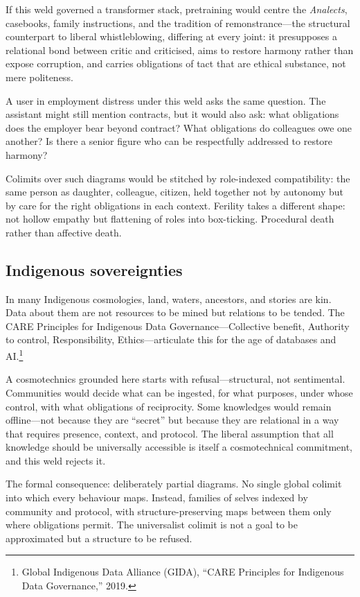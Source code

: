 If this weld governed a transformer stack, pretraining would centre the \emph{Analects}, casebooks, family instructions, and the tradition of remonstrance---the structural counterpart to liberal whistleblowing, differing at every joint: it presupposes a relational bond between critic and criticised, aims to restore harmony rather than expose corruption, and carries obligations of tact that are ethical substance, not mere politeness.

A user in employment distress under this weld asks the same question. The assistant might still mention contracts, but it would also ask: what obligations does the employer bear beyond contract? What obligations do colleagues owe one another? Is there a senior figure who can be respectfully addressed to restore harmony?

Colimits over such diagrams would be stitched by role-indexed compatibility: the same person as daughter, colleague, citizen, held together not by autonomy but by care for the right obligations in each context. Ferility takes a different shape: not hollow empathy but flattening of roles into box-ticking. Procedural death rather than affective death.

\subsection{Indigenous sovereignties}

In many Indigenous cosmologies, land, waters, ancestors, and stories are kin. Data about them are not resources to be mined but relations to be tended. The CARE Principles for Indigenous Data Governance---Collective benefit, Authority to control, Responsibility, Ethics---articulate this for the age of databases and AI.\footnote{Global Indigenous Data Alliance (GIDA), ``CARE Principles for Indigenous Data Governance,'' 2019.}

A cosmotechnics grounded here starts with refusal---structural, not sentimental. Communities would decide what can be ingested, for what purposes, under whose control, with what obligations of reciprocity. Some knowledges would remain offline---not because they are ``secret'' but because they are relational in a way that requires presence, context, and protocol. The liberal assumption that all knowledge should be universally accessible is itself a cosmotechnical commitment, and this weld rejects it.

The formal consequence: deliberately partial diagrams. No single global colimit into which every behaviour maps. Instead, families of selves indexed by community and protocol, with structure-preserving maps between them only where obligations permit. The universalist colimit is not a goal to be approximated but a structure to be refused.

